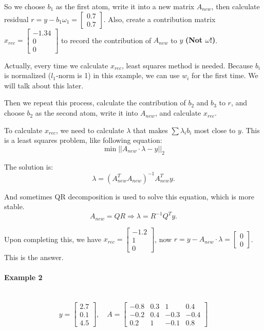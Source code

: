 \documentclass[12pt]{ctexart}
\begin{document}
So we choose $b_1$ as the first atom, write it into a new matrix $A_{new}$, then
calculate residual $r = y - b_1\omega_1 = \begin{bmatrix} 0.7 \\ 0.7 \end{bmatrix}$.
Also, create a contribution matrix $x_{rec} = \begin{bmatrix} -1.34 \\ 0 \\ 0
\end{bmatrix}$ to record the contribution of $A_{new}$ to $y$ \textbf{(Not $\omega$!)}.

Actually, every time we calculate $x_{rec}$, least squares method is needed.
Because $b_i$ is normalized ($l_1$-norm is 1) in this example, we can use $w_i$ for
the first time. We will talk about this later.

Then we repeat this process, calculate the contribution of $b_2$ and $b_3$ to $r$,
and choose $b_2$ as the second atom, write it into $A_{new}$, and calculate $x_{rec}$.

To calculate $x_{rec}$, we need to calculate $\lambda$ that makes $\sum \lambda_i b_i$
most close to $y$. This is a least squares problem, like following equation:
\[
  \min ||A_{new} \cdot \lambda - y||_2
\]

The solution is:
\[
  \lambda = (A_{new}^TA_{new})^{-1}A_{new}^Ty.
\]

And sometimes QR decomposition is used to solve this equation, which is more stable.
\[
  A_{new} = QR \Rightarrow \lambda = R^{-1}Q^Ty.
\]

Upon completing this, we have $x_{rec} = \begin{bmatrix} -1.2 \\ 1 \\ 0 \end{bmatrix}$,
now $r = y - A_{new} \cdot \lambda = \begin{bmatrix} 0 \\ 0 \end{bmatrix}$.  This is the
answer.

\paragraph{\textbf{Example 2}}\mbox{}\\
\[
  y = \begin{bmatrix} 2.7 \\ 0.1 \\ 4.5\end{bmatrix}, \quad 
  A = \begin{bmatrix} -0.8 & 0.3 & 1 & 0.4 \\ -0.2 & 0.4 & -0.3 & -0.4 \\
  0.2 & 1 & -0.1 & 0.8 \end{bmatrix}
\]
\end{document}
